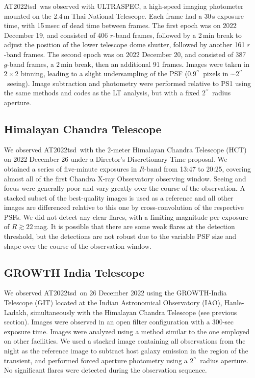\documentclass{nature_plusfigure}
\newcommand{\at}{AT2022tsd}
\newcommand{\arcsec}{$^{\prime\prime}$}
\begin{document}
\begin{methods}
\at\ was observed with ULTRASPEC\cite{Dhillon2014}, a high-speed imaging photometer mounted on the 2.4\,m Thai National Telescope. Each frame had a 30\,s exposure time, with 15\,msec of dead time between frames. The first epoch was on 2022 December 19, and consisted of 406 $r$-band frames, followed by a 2\,min break to adjust the position of the lower telescope dome shutter, followed by another 161 $r$-band frames. The second epoch was on 2022 December 20, and consisted of 387 $g$-band frames, a 2\,min break, then an additional 91 frames.  Images were taken in $2\times2$ binning, leading to a slight undersampling of the PSF (0.9\arcsec\ pixels in $\sim$2\arcsec\ seeing).  Image subtraction and photometry were performed relative to PS1 using the same methods and codes as the LT analysis, but with a fixed 2\arcsec\ radius aperture.

\subsection{Himalayan Chandra Telescope}
\label{sec:HCT}

We observed \at\ with the 2-meter Himalayan Chandra Telescope (HCT) on 2022 December 26 under a Director's Discretionary Time proposal. We obtained a series of five-minute exposures in $R$-band from 13:47 to 20:25, covering almost all of the first Chandra X-ray Observatory observing window.  Seeing and focus were generally poor and vary greatly over the course of the observation.  A stacked subset of the best-quality images is used as a reference and all other images are differenced relative to this one by cross-convolution of the respective PSFs.   We did not detect any clear flares, with a limiting magnitude per exposure of $R\gtrsim22\,$mag. It is possible that there are some weak flares at the detection threshold, but the detections are not robust due to the variable PSF size and shape over the course of the observation window.

\subsection{GROWTH India Telescope}
\label{sec:GIT}

We observed \at\ on 26 December 2022 using the GROWTH-India Telescope (GIT\cite{Kumar2022}) located at the Indian Astronomical Observatory (IAO), Hanle-Ladakh, simultaneously with the Himalayan Chandra Telescope (see previous section). Images were observed in an open filter configuration with a 300-sec exposure time. Images were analyzed using a method similar to the one employed on other facilities.  We used a stacked image containing all observations from the night as the reference image to subtract host galaxy emission in the region of the transient, and performed forced aperture photometry using a 2\arcsec\ radius aperture.  No significant flares were detected during the observation sequence.


\end{methods}
\end{document}
